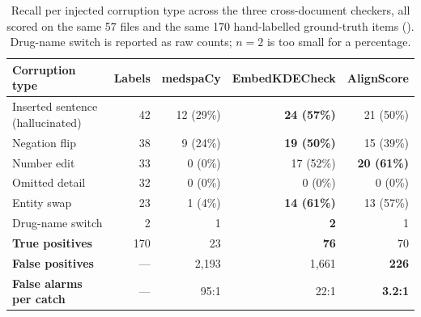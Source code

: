 
\begin{table}[htbp]
  \centering
  \begin{tabular}{lrrrr}
    \toprule
    \textbf{Corruption type} & \textbf{Labels} & \textbf{medspaCy} & \textbf{EmbedKDECheck} & \textbf{AlignScore} \\
    \midrule
    Inserted sentence (hallucinated) & 42  & 12 (29\%) & \textbf{24 (57\%)} & 21 (50\%) \\
    Negation flip                    & 38  & 9 (24\%)  & \textbf{19 (50\%)} & 15 (39\%) \\
    Number edit                      & 33  & 0 (0\%)   & 17 (52\%)          & \textbf{20 (61\%)} \\
    Omitted detail                   & 32  & 0 (0\%)   & 0 (0\%)            & 0 (0\%) \\
    Entity swap                      & 23  & 1 (4\%)   & \textbf{14 (61\%)} & 13 (57\%) \\
    Drug-name switch                 & 2   & 1         & \textbf{2}         & 1 \\
    \midrule
    \textbf{True positives}          & 170 & 23        & \textbf{76}        & 70 \\
    \textbf{False positives}         & --- & 2{,}193   & 1{,}661            & \textbf{226} \\
    \textbf{False alarms per catch}  & --- & 95:1      & 22:1               & \textbf{3.2:1} \\
    \bottomrule
  \end{tabular}
  \caption{Recall per injected corruption type across the three cross-document
  checkers, all scored on the same 57 files and the same 170 hand-labelled
  ground-truth items ().
  Drug-name switch is reported as raw counts; $n = 2$ is too small for a percentage.}
  \label{tab:checker_by_corruption_type}
\end{table}
